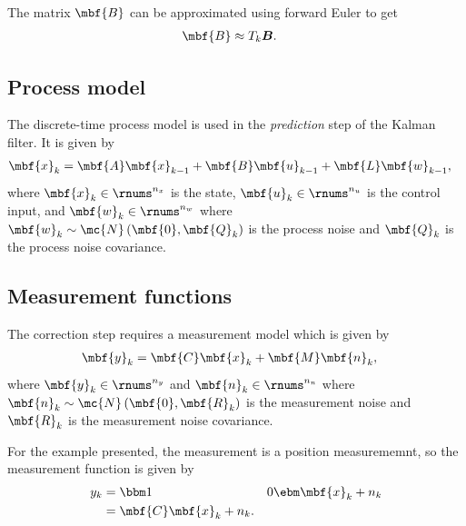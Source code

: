 \documentclass[nobib, nofonts, notoc, justified]{tufte-handout}
\begin{document}
  The matrix $\mbf{B}$ can be approximated using forward Euler to get
  \begin{align}
    \mbf{B} &\approx T_{k}\boldsymbol{B}.
  \end{align}

  \subsection{Process model}
  The discrete-time process model is used in the \emph{prediction} step of the Kalman filter. It is given by
  \begin{align}
    \label{eq:DT linear process model}
    \mbf{x}_{k} &= \mbf{A}\mbf{x}_{k-1} + \mbf{B}\mbf{u}_{k-1} + \mbf{L}\mbf{w}_{k-1},
  \end{align}
  where $\mbf{x}_{k}\in\rnums^{n_{x}}$ is the state, $\mbf{u}_{k}\in\rnums^{n_{u}}$ is the control input, and $\mbf{w}_{k}\in\rnums^{n_{w}}$ where $\mbf{w}_{k}\sim\mc{N}\left( \mbf{0}, \mbf{Q}_{k} \right)$ is the process noise and $\mbf{Q}_{k}$ is the process noise covariance. 

  \subsection{Measurement functions}
  The correction step requires a measurement model which is given by
  \begin{align}
    \mbf{y}_{k} &= \mbf{C}\mbf{x}_{k} + \mbf{M}\mbf{n}_{k},
  \end{align}
  where $\mbf{y}_{k}\in\rnums^{n_{y}}$ and $\mbf{n}_{k}\in\rnums^{n_{n}}$ where $\mbf{n}_{k}\sim\mc{N}\left( \mbf{0}, \mbf{R}_{k} \right)$ is the measurement noise and $\mbf{R}_{k}$ is the measurement noise covariance.

  For the example presented, the measurement is a position measurememnt, so the measurement function is given by
  \begin{align}
    y_{k} &= \bbm 1 & 0 \ebm\mbf{x}_{k} + n_{k}\\
    &= \mbf{C}\mbf{x}_{k} + n_{k}.
  \end{align}


\end{document}
